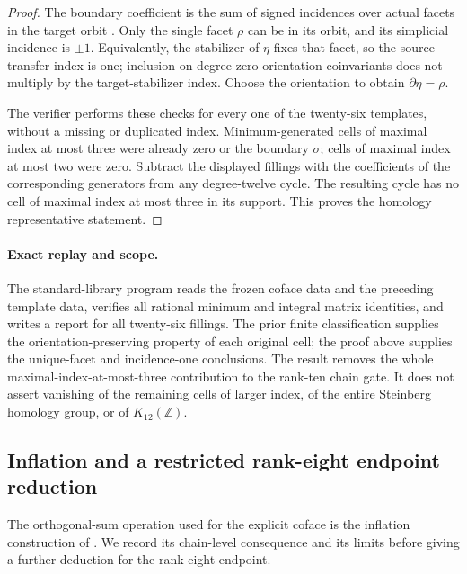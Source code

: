 \documentclass[11pt,a4paper]{article}
\theoremstyle{definition}
\begin{document}
\begin{proof}
The boundary coefficient is the sum of signed incidences over actual
facets in the target orbit
\cite[\S1.2.1, equations~(1)--(2), p.~4]{DEKM2026}.
Only the single facet $\rho$ can be in its orbit, and its simplicial
incidence is $\pm1$. Equivalently, the stabilizer of $\eta$ fixes
that facet, so the source transfer index is one; inclusion on
degree-zero orientation coinvariants does not multiply by the
target-stabilizer index. Choose the orientation to obtain
$\partial\eta=\rho$.

The verifier performs these checks for every one of the twenty-six
templates, without a missing or duplicated index. Minimum-generated
cells of maximal index at most three were already zero or the
boundary $\sigma$; cells of maximal index at most two were zero.
Subtract the displayed fillings with the coefficients of the
corresponding generators from any degree-twelve cycle. The resulting
cycle has no cell of maximal index at most three in its support.
This proves the homology representative statement.
\end{proof}

\paragraph{Exact replay and scope.}
The standard-library program
 reads the frozen
coface data and the preceding template data, verifies all rational
minimum and integral matrix identities, and writes a report for all
twenty-six fillings. The prior finite classification supplies the
orientation-preserving property of each original cell; the proof
above supplies the unique-facet and incidence-one conclusions.
The result removes the whole maximal-index-at-most-three contribution
to the rank-ten chain gate. It does not assert vanishing of the
remaining cells of larger index, of the entire Steinberg homology
group, or of $K_{12}(\mathbb Z)$.

\subsection{Inflation and a restricted rank-eight endpoint reduction}
\label{subsec:k12-coloop-rank8}

The orthogonal-sum operation used for the explicit coface is the
inflation construction of \cite[\S6.1]{ElbazGanglSoule2013}. We record
its chain-level consequence and its limits before giving a further
deduction for the rank-eight endpoint.
\end{document}
